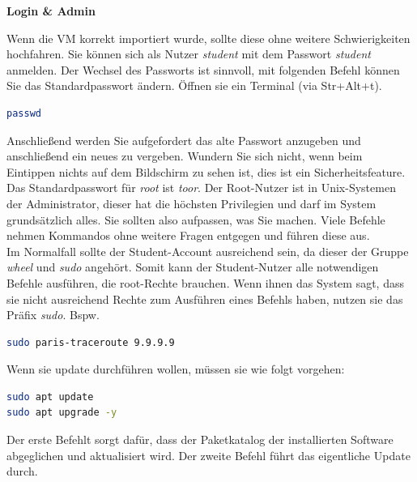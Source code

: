 \documentclass[paper=a4,fontsize=11pt]{scrartcl}%
\numberwithin{equation}{section}
\begin{document}
\begin{center}
\Large{\textbf{Login \& Admin}}
\end{center}
Wenn die VM korrekt importiert wurde, sollte diese ohne weitere Schwierigkeiten hochfahren. Sie können sich als Nutzer \emph{student} mit dem Passwort \emph{student} anmelden. Der Wechsel des Passworts ist sinnvoll, mit folgenden Befehl können Sie das Standardpasswort ändern. Öffnen sie ein Terminal (via Str+Alt+t).
\begin{lstlisting}[style=Bash, language=Bash]
passwd
\end{lstlisting}
Anschließend werden Sie aufgefordert das alte Passwort anzugeben und anschließend ein neues zu vergeben. Wundern Sie sich nicht, wenn beim Eintippen nichts auf dem Bildschirm zu sehen ist, dies ist ein Sicherheitsfeature.\\
Das Standardpasswort für \emph{root} ist \emph{toor}. Der Root-Nutzer ist in Unix-Systemen der Administrator, dieser hat die höchsten Privilegien und darf im System grundsätzlich alles. Sie sollten also aufpassen, was Sie machen. Viele Befehle nehmen Kommandos ohne weitere Fragen entgegen und führen diese aus.\\
Im Normalfall sollte der Student-Account ausreichend sein, da dieser der Gruppe \emph{wheel} und \emph{sudo} angehört. Somit kann der Student-Nutzer alle notwendigen Befehle ausführen, die root-Rechte brauchen. Wenn ihnen das System sagt, dass sie nicht ausreichend Rechte zum Ausführen eines Befehls haben, nutzen sie das Präfix \emph{sudo}. Bspw.\\
\begin{lstlisting}[style=Bash, language=Bash]
sudo paris-traceroute 9.9.9.9
\end{lstlisting}
Wenn sie update durchführen wollen, müssen sie wie folgt vorgehen:
\begin{lstlisting}[style=Bash, language=Bash]
sudo apt update
sudo apt upgrade -y
\end{lstlisting}
Der erste Befehlt sorgt dafür, dass der Paketkatalog der installierten Software abgeglichen und aktualisiert wird. Der zweite Befehl führt das eigentliche Update durch. 
\end{document}
